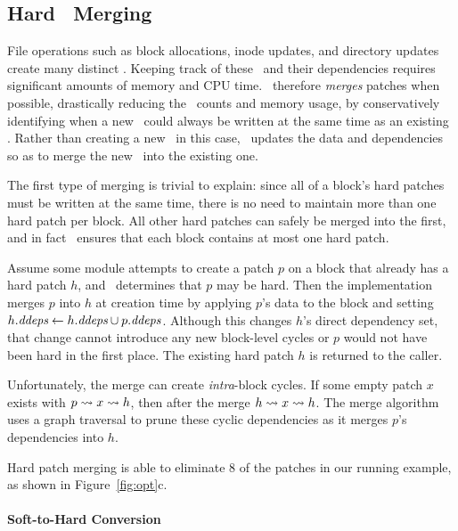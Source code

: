 
\subsection{Hard \ChDesc\ Merging}
\label{sec:patch:merge}

File operations such as block allocations, inode updates, and directory updates
create many distinct \chdescs. Keeping track of these
\chdescs\ and their dependencies requires significant amounts of memory and
CPU time.
%
\Kudos\ therefore \emph{merges} patches when possible, drastically reducing
the \chdesc\ counts and memory usage, by conservatively identifying when a
new \patch\ could always be written at the same time as an existing \patch.
%
Rather than creating a new \chdesc\ in this case, \Kudos\ updates the data
and dependencies so as to merge the new \patch\ into the existing one.


The first type of merging is trivial to explain:
%
since all of a block's hard patches must be written at the same time, there
is no need to maintain more than one hard patch per block.
%
All other hard patches can safely be merged into the first,
%
and in fact \Kudos\ ensures that each block contains at most one hard
patch.


Assume some module attempts to create a patch $p$ on a block that already
has a hard patch $h$, and \Kudos\ determines that $p$ may be hard.
%
Then the implementation merges $p$ into $h$ at creation time by applying
$p$'s data to the block and setting $\PDDepset{h} \gets \PDDepset{h} \cup
\PDDepset{p}$.
%
Although this changes $h$'s direct dependency set, that change cannot
introduce any new block-level cycles or $p$ would not have been hard in the
first place.
%
The existing hard patch $h$ is returned to the caller.


Unfortunately, the merge can create \emph{intra}-block cycles.
%
If some empty patch $x$ exists with $p \leadsto x \leadsto h$, then after
the merge $h \leadsto x \leadsto h$.
%
The merge algorithm uses a graph traversal to prune these cyclic
dependencies as it merges $p$'s dependencies into $h$.


Hard patch merging is able to eliminate 8 of the patches in our running
example, as shown in Figure~\ref{fig:opt}c.


\paragraph{Soft-to-Hard Conversion}

